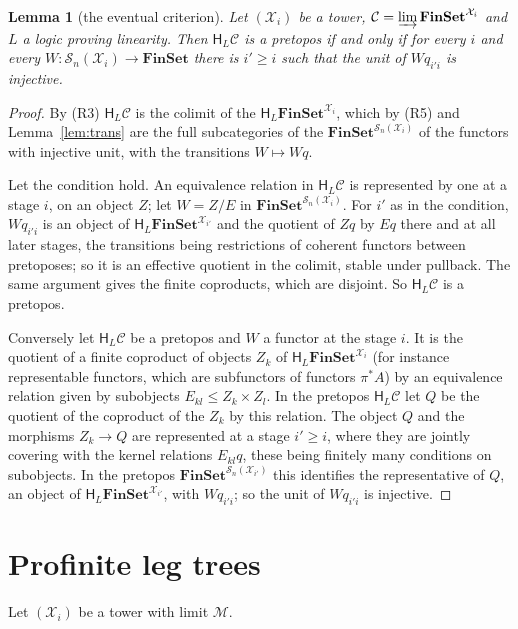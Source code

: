 \documentclass[11pt]{amsart}
\newtheorem{lem}[thm]{Lemma}
\theoremstyle{definition}
\newcommand{\Fin}{\mathbf{FinSet}}
\newcommand{\HH}{\mathsf H}
\newcommand{\cX}{\mathcal X}
\newcommand{\cC}{\mathcal C}
\newcommand{\cM}{\mathcal M}
\newcommand{\cS}{\mathcal S}
\begin{document}
\begin{lem}[the eventual criterion]\label{lem:eventual}
Let $(\cX_i)$ be a tower, $\cC=\varinjlim\Fin^{\cX_i}$ and $L$ a logic
proving linearity. Then $\HH_L\cC$ is a pretopos if and only if for
every $i$ and every $W\colon\cS_n(\cX_i)\to\Fin$ there is $i'\ge i$
such that the unit of $Wq_{i'i}$ is injective.
\end{lem}
\begin{proof}
By (R3) $\HH_L\cC$ is the colimit of the $\HH_L\Fin^{\cX_i}$, which by
(R5) and Lemma~\ref{lem:trans} are the full subcategories of the
$\Fin^{\cS_n(\cX_i)}$ of the functors with injective unit, with the
transitions $W\mapsto Wq$.

Let the condition hold. An equivalence relation in $\HH_L\cC$ is
represented by one at a stage $i$, on an object $Z$; let $W=Z/E$ in
$\Fin^{\cS_n(\cX_i)}$. For $i'$ as in the condition, $Wq_{i'i}$ is an
object of $\HH_L\Fin^{\cX_{i'}}$ and the quotient of $Zq$ by $Eq$
there and at all later stages, the transitions being restrictions of
coherent functors between pretoposes; so it is an effective quotient
in the colimit, stable under pullback. The same argument gives the
finite coproducts, which are disjoint. So $\HH_L\cC$ is a pretopos.

Conversely let $\HH_L\cC$ be a pretopos and $W$ a functor at the stage
$i$. It is the quotient of a finite coproduct of objects $Z_k$ of
$\HH_L\Fin^{\cX_i}$ (for instance representable functors, which are
subfunctors of functors $\pi^*A$) by an equivalence relation given by
subobjects $E_{kl}\le Z_k\times Z_l$. In the pretopos $\HH_L\cC$ let
$Q$ be the quotient of the coproduct of the $Z_k$ by this relation.
The object $Q$ and the morphisms $Z_k\to Q$ are represented at a stage
$i'\ge i$, where they are jointly covering with the kernel relations
$E_{kl}q$, these being finitely many conditions on subobjects. In the
pretopos $\Fin^{\cS_n(\cX_{i'})}$ this identifies the representative
of $Q$, an object of $\HH_L\Fin^{\cX_{i'}}$, with $Wq_{i'i}$; so the
unit of $Wq_{i'i}$ is injective.
\end{proof}


\section{Profinite leg trees}\label{sec:trees}

Let $(\cX_i)$ be a tower with limit $\cM$.
\end{document}
